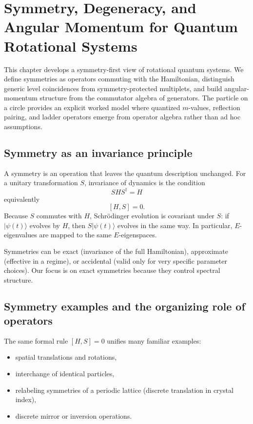 \chapter{Symmetry, Degeneracy, and Angular Momentum for Quantum Rotational Systems}

This chapter develops a symmetry-first view of rotational quantum systems. We define symmetries as operators commuting with the Hamiltonian, distinguish generic level coincidences from symmetry-protected multiplets, and build angular-momentum structure from the commutator algebra of generators. The particle on a circle provides an explicit worked model where quantized \(m\)-values, reflection pairing, and ladder operators emerge from operator algebra rather than ad hoc assumptions.

\section{Symmetry as an invariance principle}
A symmetry is an operation that leaves the quantum description unchanged. For a unitary transformation \(S\), invariance of dynamics is the condition
\[
S H S^\dagger = H
\]
equivalently
\[
[H,S]=0.
\]
Because \(S\) commutes with \(H\), Schr\"odinger evolution is covariant under \(S\): if \(|\psi(t)\rangle\) evolves by \(H\), then \(S|\psi(t)\rangle\) evolves in the same way. In particular, \(E\)-eigenvalues are mapped to the same \(E\)-eigenspaces.

Symmetries can be exact (invariance of the full Hamiltonian), approximate (effective in a regime), or accidental (valid only for very specific parameter choices). Our focus is on exact symmetries because they control spectral structure.

\section{Symmetry examples and the organizing role of operators}
The same formal rule \([H,S]=0\) unifies many familiar examples:
\begin{itemize}
\item spatial translations and rotations,
\item interchange of identical particles,
\item relabeling symmetries of a periodic lattice (discrete translation in crystal index),
\item discrete mirror or inversion operations.
\end{itemize}

